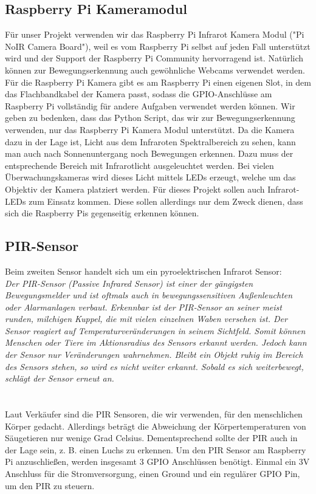\documentclass[journal]{IEEEtran}
\begin{document}
\subsection{Raspberry Pi Kameramodul}
Für unser Projekt verwenden wir das Raspberry Pi Infrarot Kamera Modul ("Pi NoIR Camera Board"), weil es vom Raspberry Pi selbst auf jeden Fall unterstützt wird und der Support der Raspberry Pi Community hervorragend ist. 
Natürlich können zur Bewegungserkennung auch gewöhnliche Webcams verwendet werden. 
Für die Raspberry Pi Kamera gibt es am Raspberry Pi einen eigenen Slot, in dem das Flachbandkabel der Kamera passt, sodass die GPIO-Anschlüsse am Raspberry Pi vollständig für andere Aufgaben verwendet werden können.
Wir geben zu bedenken, dass das Python Script, das wir zur Bewegungserkennung verwenden, nur das Raspberry Pi Kamera Modul unterstützt. 
Da die Kamera dazu in der Lage ist, Licht aus dem Infraroten Spektralbereich zu sehen, kann man auch nach Sonnenuntergang noch Bewegungen erkennen.
Dazu muss der entsprechende Bereich mit Infrarotlicht ausgeleuchtet werden.
Bei vielen Überwachungskameras wird dieses Licht mittels LEDs erzeugt, welche um das Objektiv der Kamera platziert werden.
Für dieses Projekt sollen auch Infrarot-LEDs zum Einsatz kommen.
Diese sollen allerdings nur dem Zweck dienen, dass sich die Raspberry Pis gegenseitig erkennen können.

\subsection{PIR-Sensor}
Beim zweiten Sensor handelt sich um ein pyroelektrischen Infrarot Sensor:\\
\textit{Der PIR-Sensor (Passive Infrared Sensor) ist einer der gängigsten Bewegungsmelder und ist oftmals auch in bewegungssensitiven Außenleuchten oder Alarmanlagen verbaut.
Erkennbar ist der PIR-Sensor an seiner meist runden, milchigen Kuppel, die mit vielen einzelnen Waben versehen ist. 
Der Sensor reagiert auf Temperaturveränderungen in seinem Sichtfeld. 
Somit können Menschen oder Tiere im Aktionsradius des Sensors erkannt werden. 
Jedoch kann der Sensor nur Veränderungen wahrnehmen. 
Bleibt ein Objekt ruhig im Bereich des Sensors stehen, so wird es nicht weiter erkannt. 
Sobald es sich weiterbewegt, schlägt der Sensor erneut an.}\cite[S. 493]{Raspi}\\ \\
\\
Laut Verkäufer sind die PIR Sensoren, die wir verwenden, für den menschlichen Körper gedacht. 
Allerdings beträgt die Abweichung der Körpertemperaturen von Säugetieren nur wenige Grad Celsius.
Dementsprechend sollte der PIR auch in der Lage sein, z. B. einen Luchs zu erkennen.
Um den PIR Sensor am Raspberry Pi anzuschließen, werden insgesamt 3 GPIO Anschlüssen benötigt.
Einmal ein 3V Anschluss für die Stromversorgung, einen Ground und ein regulärer GPIO Pin, um den PIR zu steuern.
\end{document}
